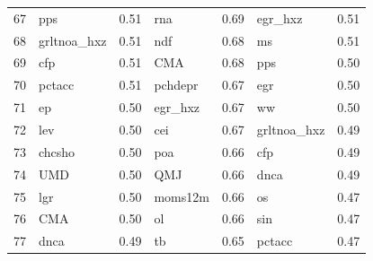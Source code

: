 \begin{footnotesize}
\begin{longtable}{rlc|lc|lc}
		67                        & pps                         & 0.51                          & rna                         & 0.69                          & egr\_hxz                          & 0.51           \\
		68                        & grltnoa\_hxz                & 0.51                          & ndf                         & 0.68                          & ms                                & 0.51           \\
		69                        & cfp                         & 0.51                          & CMA                         & 0.68                          & pps                               & 0.50           \\
		70                        & pctacc                      & 0.51                          & pchdepr                     & 0.67                          & egr                               & 0.50           \\
		71                        & ep                          & 0.50                          & egr\_hxz                    & 0.67                          & ww                                & 0.50           \\
		72                        & lev                         & 0.50                          & cei                         & 0.67                          & grltnoa\_hxz                      & 0.49           \\
		73                        & chcsho                      & 0.50                          & poa                         & 0.66                          & cfp                               & 0.49           \\
		74                        & UMD                         & 0.50                          & QMJ                         & 0.66                          & dnca                              & 0.49           \\
		75                        & lgr                         & 0.50                          & moms12m                     & 0.66                          & os                                & 0.47           \\
		76                        & CMA                         & 0.50                          & ol                          & 0.66                          & sin                               & 0.47           \\
		77                        & dnca                        & 0.49                          & tb                          & 0.65                          & pctacc                            & 0.47           \\

\end{longtable}
\end{footnotesize}
